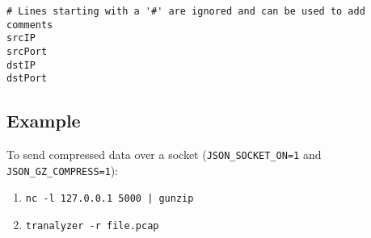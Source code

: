 \documentclass[documentation]{subfiles}
\begin{document}
\begin{verbatim}
# Lines starting with a '#' are ignored and can be used to add comments
srcIP
srcPort
dstIP
dstPort
\end{verbatim}

\subsection{Example}
To send compressed data over a socket ({\tt JSON\_SOCKET\_ON=1} and {\tt JSON\_GZ\_COMPRESS=1}):
\begin{enumerate}
    \item {\tt nc -l 127.0.0.1 5000 | gunzip}
    \item {\tt tranalyzer -r file.pcap}
\end{enumerate}
\end{document}
